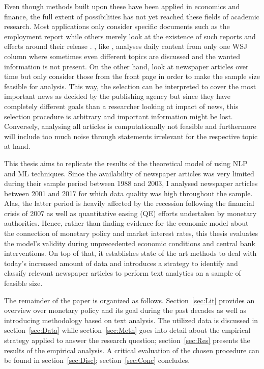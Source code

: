 Even though methods built upon these have been applied in economics and finance, the full extent of possibilities has not yet reached these fields of academic research. Most applications only consider specific documents such as the employment report \parencite{Hautsch.2002,Hess.2004} while others merely look at the existence of such reports and effects around their release \parencite{Bomfim.2003,Hautsch.2011,Lucca.2015}. \textcite{Tetlock.2007}, like \textcite{Ellingsen.2001}, analyses daily content from only one WSJ column where sometimes even different topics are discussed and the wanted information is not present. On the other hand, \textcite{Manela.2017} look at newspaper articles over time but only consider those from the front page in order to make the sample size feasible for analysis. This way, the selection can be interpreted to cover the most important news as decided by the publishing agency but since they have completely different goals than a researcher looking at impact of news, this selection procedure is arbitrary and important information might be lost. Conversely, analysing all articles is computationally not feasible and furthermore will include too much noise through statements irrelevant for the respective topic at hand.

This thesis aims to replicate the results of the theoretical model of \textcite{Ellingsen.2001} using NLP and ML techniques. Since the availability of newspaper articles was very limited during their sample period between 1988 and 2003, I analysed newspaper articles between 2001 and 2017 for which data quality was high throughout the sample. Alas, the latter period is heavily affected by the recession following the financial crisis of 2007 as well as quantitative easing (QE) efforts undertaken by monetary authorities. Hence, rather than finding evidence for the economic model about the connection of monetary policy and market interest rates, this thesis evaluates the model's validity during unprecedented economic conditions and central bank interventions. On top of that, it establishes state of the art methods to deal with today's increased amount of data and introduces a strategy to identify and classify relevant newspaper articles to perform text analytics on a sample of feasible size. 

The remainder of the paper is organized as follows. Section~\ref{sec:Lit} provides an overview over monetary policy and its goal during the past decades as well as introducing methodology based on text analysis. The utilized data is discussed in section~\ref{sec:Data} while section~\ref{sec:Meth} goes into detail about the empirical strategy applied to answer the research question; section~\ref{sec:Res} presents the results of the empirical analysis. A critical evaluation of the chosen procedure can be found in section~\ref{sec:Disc}; section~\ref{sec:Conc} concludes.
%
%